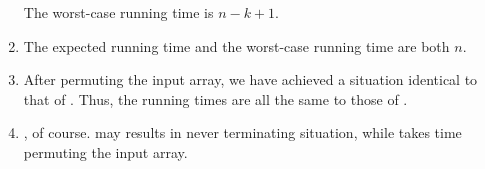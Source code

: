 \documentclass[a4paper, fleqn]{article}
\begin{document}
\begin{enumerate}
The worst-case running time is $n - k + 1$.

\item %
The expected running time and the worst-case running time are both $n$.

\item %
After permuting the input array, we have achieved a situation identical to that 
of . Thus, the running times are all the same to those 
of .

\item %
, of course.  may results in 
never terminating situation, while  takes time permuting 
the input array.

\end{enumerate}
\end{document}
